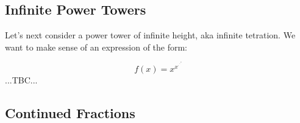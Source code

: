 



\begin{comment}

To solve it, use the Sage code:

a = 3
b = 2
k = a + b^2/2
s = sqrt(k^2 - a^2)
x1 = k + s
x2 = k - s
y1 = a + b * sqrt(x1)
y2 = a + b * sqrt(x2)
N(x1),N(y1), N(x2),N(y2)

which gives:

(9.00000000000000, 9.00000000000000, 1.00000000000000, 5.00000000000000)


Check the formula against Mathematica's result:

https://www.wolframalpha.com/input?i=solve+x+%

Here is a plot of  f(x) = x  and  f(x) = a + b sqrt(x)  with adjustable a,b:
  https://www.desmos.com/calculator/epu6yonem9
The intersection of the graphs should be our solution

\end{comment}




\subsection{Infinite Power Towers}
Let's next consider a power tower of infinite height, aka infinite tetration. We want to make sense of an expression of the form:

\begin{equation}
f(x) = x^{x^{\cdot^{\cdot^{\cdot^x}}}}
\end{equation}
...TBC...


\subsection{Continued Fractions}

